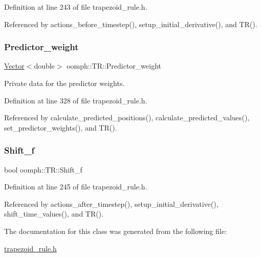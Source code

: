 Definition at line 243 of file trapezoid\+\_\+rule.\+h.



Referenced by actions\+\_\+before\+\_\+timestep(), setup\+\_\+initial\+\_\+derivative(), and T\+R().

\mbox{\label{classoomph_1_1TR_a32b1f670090854c3e28611ee5b3cf220}} 
\subsubsection{\texorpdfstring{Predictor\+\_\+weight}{Predictor\_weight}}
{\footnotesize\ttfamily \hyperlink{classoomph_1_1Vector}{Vector}$<$double$>$ oomph\+::\+T\+R\+::\+Predictor\+\_\+weight\hspace{0.3cm}{\ttfamily [private]}}



Private data for the predictor weights. 



Definition at line 328 of file trapezoid\+\_\+rule.\+h.



Referenced by calculate\+\_\+predicted\+\_\+positions(), calculate\+\_\+predicted\+\_\+values(), set\+\_\+predictor\+\_\+weights(), and T\+R().

\mbox{\label{classoomph_1_1TR_a3b60f7e2fc8d15a3e6ed4ea29d59ffdd}} 
\subsubsection{\texorpdfstring{Shift\+\_\+f}{Shift\_f}}
{\footnotesize\ttfamily bool oomph\+::\+T\+R\+::\+Shift\+\_\+f}



Definition at line 245 of file trapezoid\+\_\+rule.\+h.



Referenced by actions\+\_\+after\+\_\+timestep(), setup\+\_\+initial\+\_\+derivative(), shift\+\_\+time\+\_\+values(), and T\+R().



The documentation for this class was generated from the following file\+:\begin{DoxyCompactItemize}
\item 
\hyperlink{trapezoid__rule_8h}{trapezoid\+\_\+rule.\+h}\end{DoxyCompactItemize}

